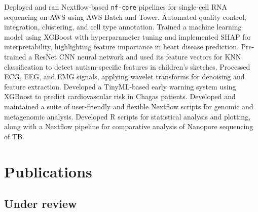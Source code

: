 \documentclass[11pt,a4paper,sans]{moderncv}
\begin{document}
    {{\footnotesize Deployed and ran Nextflow-based \texttt{nf-core} pipelines for single-cell RNA sequencing on AWS using AWS Batch and Tower. Automated quality control, integration, clustering, and cell type annotation.}}{}{}
    {}
    {{\footnotesize Trained a machine learning model using XGBoost with hyperparameter tuning and implemented SHAP for interpretability, highlighting feature importance in heart disease prediction.}}{}{}
    {}  
    {{\footnotesize Pre-trained a ResNet CNN neural network and used its feature vectors for KNN classification to detect autism-specific features in children's sketches.}}{}{}
    {}
    {{\footnotesize Processed ECG, EEG, and EMG signals, applying wavelet transforms for denoising and feature extraction. Developed a TinyML-based early warning system using XGBoost to predict cardiovascular risk in Chagas patients.}}{}{}
    {}
    {{\footnotesize Developed and maintained a suite of user-friendly and flexible Nextflow scripts for genomic and metagenomic analysis.}}{}{}
    {}
    {{\footnotesize Developed R scripts for statistical analysis and plotting, along with a Nextflow pipeline for comparative analysis of Nanopore sequencing of TB.}}{}{}
    {}

\section{Publications}
\subsection{Under review}
\end{document}
